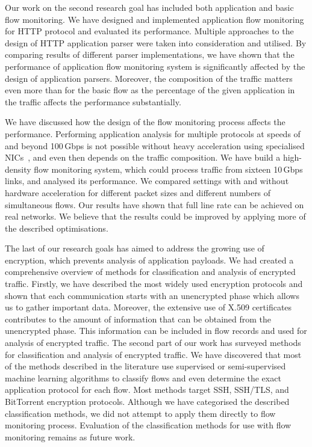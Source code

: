 Our work on the second research goal has included both application and basic flow monitoring. We have designed and implemented application flow monitoring for HTTP protocol and evaluated its performance. Multiple approaches to the design of HTTP application parser were taken into consideration and utilised. By comparing results of different parser implementations, we have shown that the performance of application flow monitoring system is significantly affected by the design of application parsers. Moreover, the composition of the traffic matters even more than for the basic flow as the percentage of the given application in the traffic affects the performance substantially.

We have discussed how the design of the flow monitoring process affects the performance. Performing application analysis for multiple protocols at speeds of and beyond 100\,Gbps is not possible without heavy acceleration using specialised NICs~\cite{Kekely-2016-Software}, and even then depends on the traffic composition. We have build a high-density flow monitoring system, which could process traffic from sixteen 10\,Gbps links, and analysed its performance. We compared settings with and without hardware acceleration for different packet sizes and different numbers of simultaneous flows. Our results have shown that full line rate can be achieved on real networks. We believe that the results could be improved by applying more of the described optimisations.

The last of our research goals has aimed to address the growing use of encryption, which prevents analysis of application payloads. We had created a comprehensive overview of methods for classification and analysis of encrypted traffic. Firstly, we have described the most widely used encryption protocols and shown that each communication starts with an unencrypted phase which allows us to gather important data. Moreover, the extensive use of X.509 certificates contributes to the amount of information that can be obtained from the unencrypted phase. This information can be included in flow records and used for analysis of encrypted traffic. The second part of our work has surveyed methods for classification and analysis of encrypted traffic. We have discovered that most of the methods described in the literature use supervised or semi-supervised machine learning algorithms to classify flows and even determine the exact application protocol for each flow. Most methods target SSH, SSH/TLS, and BitTorrent encryption protocols. Although we have categorised the described classification methods, we did not attempt to apply them directly to flow monitoring process. Evaluation of the classification methods for use with flow monitoring remains as future work.


